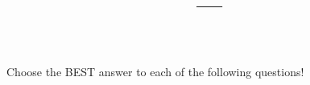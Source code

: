 \documentclass[12pt,letterpaper,landscape,twocolumn,twoside]{article}
\title{{\large \bfseries \vspace*{-12.5mm} \CLASS{} --- \SEMESTER}\\
\vspace*{-2.5mm}
\vspace{.5\baselineskip}
\small
\tcbox[left=0mm,right=0mm,top=0mm,bottom=0mm,boxsep=0mm,
toptitle=0.5mm,bottomtitle=0.5mm,title=\large{\hspace{4.5cm}\EXAM{} --- \VERSION}]{%
\arrayrulecolor{white!50!black}\renewcommand{\arraystretch}{1.2}%
\begin{tabular}{l||l}
\textbf{Name}  & {\hspace{8.5cm}} \\[1.5ex]
\hline
\textbf{NetID} & \\[1.5ex]
\hline
\textbf{Peoplesoft \#} & \\[1.5ex]
\hline
\textbf{Section \#} & \\[1.5ex]
\end{tabular}}
}
\date{}
\author{}
\newcounter{question}
\begin{document}
\fontsize{10}{12.5} \selectfont
\maketitle
\thispagestyle{empty}
\vspace{-5em} %
\begin{instructions}
Choose the BEST answer to each of the following questions!
\end{instructions}


\end{document}
